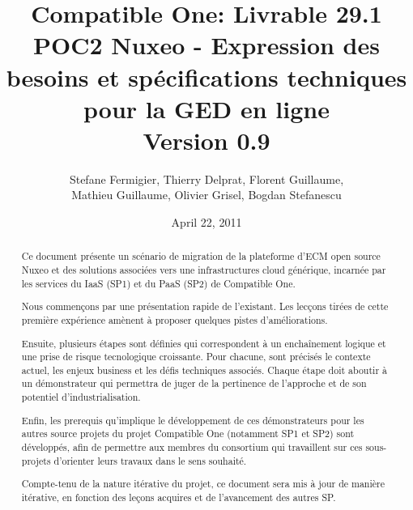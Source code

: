 \documentclass[a4paper,11pt]{article}
\title{Compatible One: Livrable 29.1\\
POC2 Nuxeo - Expression des besoins et spécifications techniques\\
pour la GED en ligne\\
Version 0.9}
\date{April 22, 2011}
\author{Stefane Fermigier, Thierry Delprat, Florent Guillaume,\\
Mathieu Guillaume, Olivier Grisel, Bogdan Stefanescu}
\begin{document}
\maketitle

\begin{abstract}
  Ce document présente un scénario de migration de la plateforme d'ECM open source Nuxeo et des solutions associées vers une infrastructures cloud générique, incarnée par les services du IaaS (SP1) et du PaaS (SP2) de Compatible One.
  
  Nous commençons par une présentation rapide de l'existant. Les lecçons tirées de cette première expérience amènent à proposer quelques pistes d'améliorations.
  
  Ensuite, plusieurs étapes sont définies qui correspondent à un enchaînement logique et une prise de risque tecnologique croissante. Pour chacune, sont précisés le contexte actuel, les enjeux business et les défis techniques associés. Chaque étape doit aboutir à un démonstrateur qui permettra de juger de la pertinence de l'approche et de son potentiel d'industrialisation.
  
  Enfin, les prerequis qu'implique le développement de ces démonstrateurs pour les autres source projets du projet Compatible One (notamment SP1 et SP2) sont développés, afin de permettre aux membres du consortium qui travaillent sur ces sous-projets d'orienter leurs travaux dans le sens souhaité.

  Compte-tenu de la nature itérative du projet, ce document sera mis à jour de manière itérative, en fonction des leçons acquires et de l'avancement des autres SP.
\end{abstract}

\tableofcontents

\pagebreak




\end{document}
